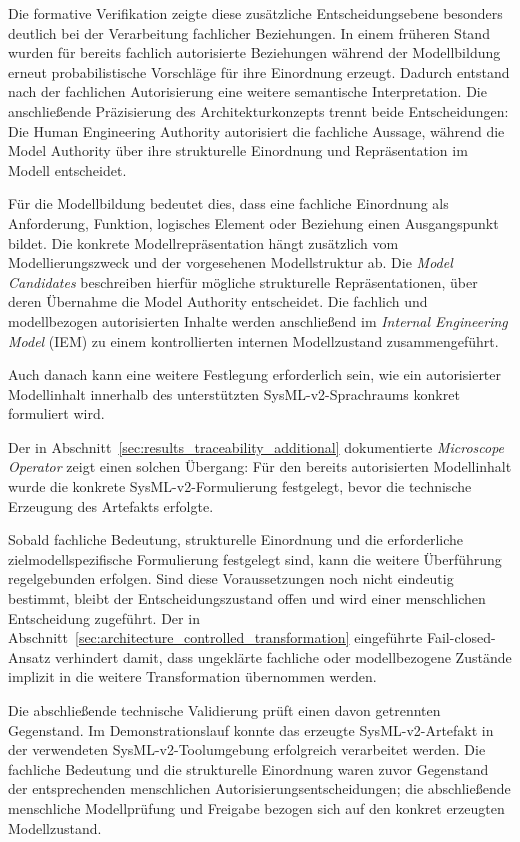 Die formative Verifikation zeigte diese zusätzliche Entscheidungsebene
besonders deutlich bei der Verarbeitung fachlicher Beziehungen. In einem
früheren Stand wurden für bereits fachlich autorisierte Beziehungen während
der Modellbildung erneut probabilistische Vorschläge für ihre Einordnung
erzeugt. Dadurch entstand nach der fachlichen Autorisierung eine weitere
semantische Interpretation. Die anschließende Präzisierung des
Architekturkonzepts trennt beide Entscheidungen: Die Human Engineering
Authority autorisiert die fachliche Aussage, während die Model Authority
über ihre strukturelle Einordnung und Repräsentation im Modell entscheidet.

Für die Modellbildung bedeutet dies, dass eine fachliche Einordnung als
Anforderung, Funktion, logisches Element oder Beziehung einen Ausgangspunkt
bildet. Die konkrete Modellrepräsentation hängt zusätzlich vom
Modellierungszweck und der vorgesehenen Modellstruktur ab. Die
\emph{Model Candidates} beschreiben hierfür mögliche strukturelle
Repräsentationen, über deren Übernahme die Model Authority entscheidet. Die
fachlich und modellbezogen autorisierten Inhalte werden anschließend im
\emph{Internal Engineering Model} (IEM) zu einem kontrollierten internen
Modellzustand zusammengeführt.

Auch danach kann eine weitere Festlegung erforderlich sein, wie ein
autorisierter Modellinhalt innerhalb des unterstützten SysML-v2-Sprachraums
konkret formuliert wird. 

\noindent Der in
Abschnitt~\ref{sec:results_traceability_additional} dokumentierte
\emph{Microscope Operator} zeigt einen solchen Übergang: Für den bereits
autorisierten Modellinhalt wurde die konkrete SysML-v2-Formulierung
festgelegt, bevor die technische Erzeugung des Artefakts erfolgte.

Sobald fachliche Bedeutung, strukturelle Einordnung und die erforderliche
zielmodellspezifische Formulierung festgelegt sind, kann die weitere
Überführung regelgebunden erfolgen. Sind diese Voraussetzungen noch nicht
eindeutig bestimmt, bleibt der Entscheidungszustand offen und wird einer
menschlichen Entscheidung zugeführt. Der in
Abschnitt~\ref{sec:architecture_controlled_transformation} eingeführte
Fail-closed-Ansatz verhindert damit, dass ungeklärte fachliche oder
modellbezogene Zustände implizit in die weitere Transformation übernommen
werden.

Die abschließende technische Validierung prüft einen davon getrennten
Gegenstand. Im Demonstrationslauf konnte das erzeugte SysML-v2-Artefakt in
der verwendeten SysML-v2-Toolumgebung erfolgreich verarbeitet werden. Die
fachliche Bedeutung und die strukturelle Einordnung waren zuvor Gegenstand
der entsprechenden menschlichen Autorisierungsentscheidungen; die
abschließende menschliche Modellprüfung und Freigabe bezogen sich auf den
konkret erzeugten Modellzustand.

